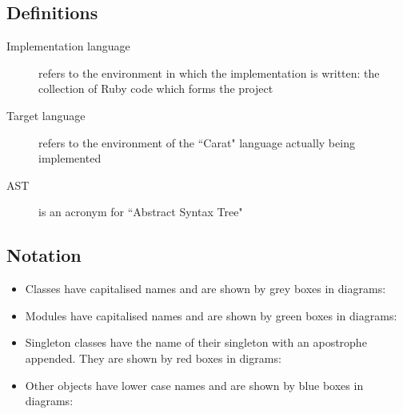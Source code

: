 \subsection{Definitions}

\begin{description}
	\item[Implementation language] refers to the environment in which the implementation is written: the collection of Ruby code which forms the project
	\item[Target language] refers to the environment of the ``Carat" language actually being implemented
	\item[AST] is an acronym for ``Abstract Syntax Tree"
\end{description}

\subsection{Notation}

\begin{itemize}
  \item Classes have capitalised names and are shown by grey boxes in diagrams: \\
  
  \item Modules have capitalised names and are shown by green boxes in diagrams: \\
  
  \item Singleton classes have the name of their singleton with an apostrophe appended. They are shown by red boxes in digrams: \\
  
  \item Other objects have lower case names and are shown by blue boxes in diagrams: \\
\end{itemize}
